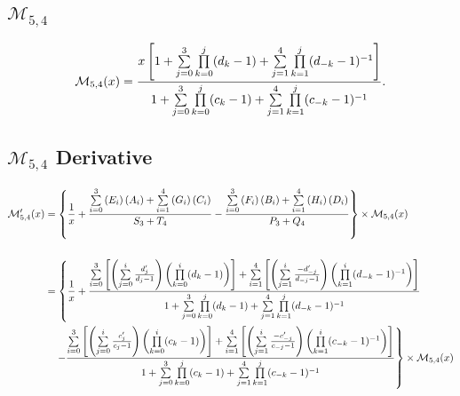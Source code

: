 \documentclass{article}
\begin{document}
\newpage
\subsection{$\mathcal{M}_{5,4}$}
$$\mathcal{M}_{5,4}(x)=\frac{x\left[1+\sum\limits_{j=0}^{3}\prod\limits_{k=0}^{j}(d_k-1)+
\sum\limits_{j=1}^{4}\prod\limits_{k=1}^{j}(d_{-k}-1)^{-1}\right]}{1+
\sum\limits_{j=0}^{3}\prod\limits_{k=0}^j(c_k-1)+
\sum_{j=1}^4\limits\prod_{k=1}^{j}\limits(c_{-k}-1)^{-1}}.$$

\subsection{$\mathcal{M}_{5,4}$ Derivative}
\begin{align*}
    \mathcal{M}_{5,4}'(x)
    &=\left\{\frac{1}{x}+\frac{
        \sum_{i=0}^{3}\limits\left(E_i\right)\left(A_i\right)
        +\sum_{i=1}^{4}\limits\left(G_i\right)\left(C_i\right)}{S_3 + T_4} 
    - \frac{
        \sum_{i=0}^{3}\limits\left(F_i\right)\left(B_i\right)
        +\sum_{i=1}^{4}\limits\left(H_i\right)\left(D_i\right)}{P_3+Q_4}\right\} 
    \times \mathcal{M}_{5,4} (x)\\ \\
    &=\left\{\frac{1}{x}+
    \frac{\sum_{i=0}^{3}\limits\left[\left(\sum_{j=0}^{i}\limits\frac{d_j'}{d_j-1}\right)
    \left(\prod_{k=0}^{i}\limits(d_k-1)\right)\right]
    +\sum_{i=1}^{4}\limits\left[\left(\sum_{j=1}^{i}\limits\frac{-d_{-j}'}{d_{-j}-1}\right)
    \left(\prod_{k=1}^{i}\limits(d_{-k}-1)^{-1}\right)\right]}{1+\sum\limits_{j=0}^{3}
    \prod\limits_{k=0}^{j}(d_k-1)+
    \sum\limits_{j=1}^{4}\prod\limits_{k=1}^{j}(d_{-k}-1)^{-1}}\right. \\
    &\quad \left. - \frac{\sum_{i=0}^{3}\limits\left[\left(\sum_{j=0}^{i}\limits\frac{c_j'}{c_j-1}\right)
    \left(\prod_{k=0}^{i}\limits(c_k-1)\right)\right]
    +\sum_{i=1}^{4}\limits\left[\left(\sum_{j=1}^{i}\limits\frac{-c_{-j}'}{c_{-j}-1}\right)
    \left(\prod_{k=1}^{i}\limits(c_{-k}-1)^{-1}\right)\right]}{1+
    \sum\limits_{j=0}^{3}\prod\limits_{k=0}^j(c_k-1)+
    \sum_{j=1}^4\limits\prod_{k=1}^{j}\limits(c_{-k}-1)^{-1}}\right\} \times \mathcal{M}_{5,4}(x)
\end{align*}
\end{document}
